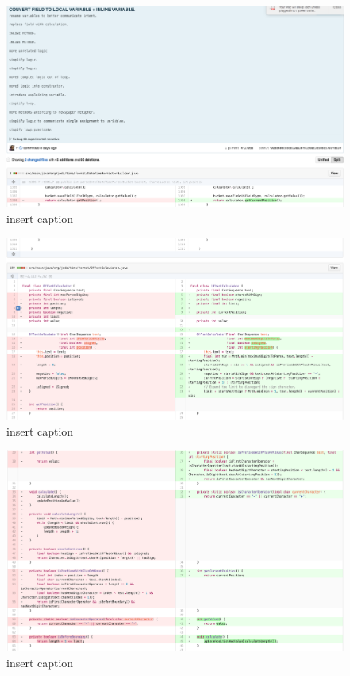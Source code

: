 \begin{figure}[H]
	\centering
	\includegraphics[width=\linewidth]{code125}
	\caption{insert caption}
\end{figure}
\begin{figure}[H]
	\centering
	\includegraphics[width=\linewidth]{code126}
	\caption{insert caption}
\end{figure}
\begin{figure}[H]
	\centering
	\includegraphics[width=\linewidth]{code127}
	\caption{insert caption}
\end{figure}
